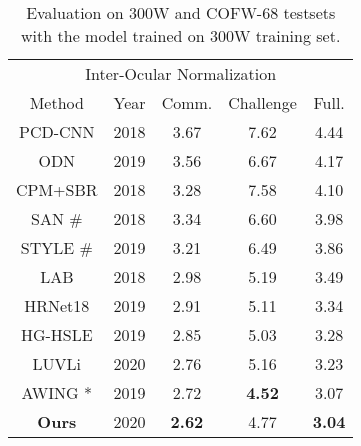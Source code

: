 \documentclass[runningheads]{llncs}
\begin{document}
\begin{table}[t!]
{{\begin{tabular}{ccccc}
            \multicolumn{5}{c}{Inter-Ocular Normalization} \\
        \cmidrule{1-5}
            Method & Year & Comm. & Challenge & Full. \\
        \cmidrule{1-5}
                PCD-CNN \cite{kumar2018disentangling} & 2018 & 3.67 & 7.62 & 4.44 \\
                ODN \cite{zhu2019robust} & 2019 & 3.56 & 6.67 & 4.17 \\
                CPM+SBR \cite{dong2018supervision} & 2018 & 3.28 & 7.58 & 4.10 \\
                SAN \cite{dong2018style} \# & 2018 & 3.34 & 6.60 & 3.98\\
                STYLE \cite{qian2019aggregation} \# & 2019 & 3.21 & 6.49 & 3.86 \\
                LAB \cite{wu2018look} & 2018 & 2.98 & 5.19 & 3.49 \\
                HRNet18 \cite{sun2019deep} & 2019 & 2.91 & 5.11 & 3.34 \\
                HG-HSLE \cite{zoulearning} & 2019 & 2.85 & 5.03 & 3.28 \\
                LUVLi \cite{kumar2020luvli} & 2020 & 2.76 & 5.16 & 3.23 \\
                AWING \cite{wang2019adaptive} * & 2019 & 2.72 & \textbf{4.52} & 3.07 \\
                \textbf{Ours} & 2020 & \textbf{2.62} & 4.77 & \textbf{3.04}\\
        \bottomrule
      \end{tabular}
      \label{tab:300w}
      }
      }
      \quad
      \parbox{.455\linewidth}{
      \centering
        \caption{Evaluation on 300W and COFW-68 testsets with the model trained on 300W training set. 
}
          }
\end{table}
\end{document}
